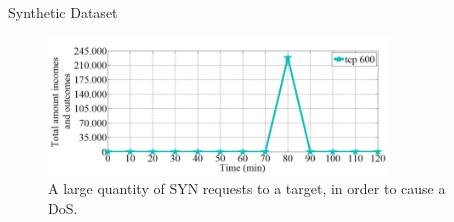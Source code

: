 \documentclass[newPxFont, numfooter, sectionpages]{beamer}
\begin{document}

\begin{frame}[c]{Synthetic Dataset}
	
	\begin{figure}[h!]
	     \centering 
	     \includegraphics[width=9cm]{../figures/fig05.png}
	     \caption{A large quantity of SYN requests to a target, in order to cause a DoS.}
	     \label{fig:2_fig5}
	\end{figure}

\end{frame}
	

	
\end{document}
